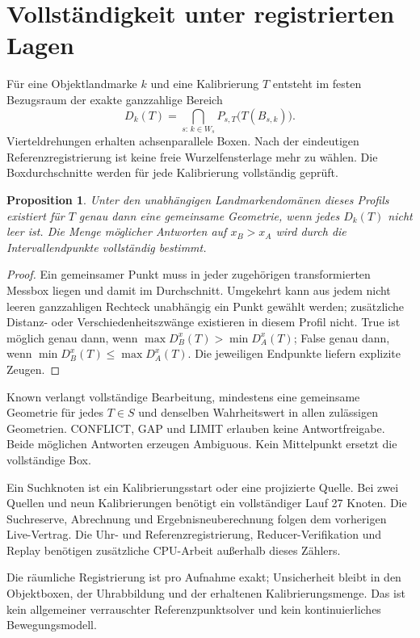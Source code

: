 \documentclass[11pt,a4paper]{article}
\newcommand{\nextsection}[2]{\clearpage{\color{accent}\small\textsf{#1}}\section{#2}}
\newtheorem{proposition}{Proposition}[section]
\begin{document}
\nextsection{79 / GEMEINSAME GEOMETRIE}{Vollständigkeit unter registrierten Lagen}
Für eine Objektlandmarke $k$ und eine Kalibrierung $T$ entsteht
im festen Bezugsraum der exakte ganzzahlige Bereich
\[
D_k(T)=\bigcap_{s:\,k\in W_s}P_{s,T}\bigl(T(B_{s,k})\bigr).
\]
Vierteldrehungen erhalten achsenparallele Boxen. Nach der eindeutigen
Referenzregistrierung ist keine freie Wurzelfensterlage mehr zu wählen.
Die Boxdurchschnitte werden für jede Kalibrierung vollständig geprüft.

\begin{proposition}
Unter den unabhängigen Landmarkendomänen dieses Profils existiert
für $T$ genau dann eine gemeinsame Geometrie, wenn jedes $D_k(T)$
nicht leer ist. Die Menge möglicher Antworten auf $x_B>x_A$ wird
durch die Intervallendpunkte vollständig bestimmt.
\end{proposition}
\begin{proof}
Ein gemeinsamer Punkt muss in jeder zugehörigen transformierten
Messbox liegen und damit im Durchschnitt. Umgekehrt kann aus jedem
nicht leeren ganzzahligen Rechteck unabhängig ein Punkt gewählt
werden; zusätzliche Distanz- oder Verschiedenheitszwänge existieren
in diesem Profil nicht. True ist möglich genau dann, wenn
$\max D_B^x(T)>\min D_A^x(T)$; False genau dann, wenn
$\min D_B^x(T)\leq\max D_A^x(T)$. Die jeweiligen Endpunkte liefern
explizite Zeugen.
\end{proof}

Known verlangt vollständige Bearbeitung, mindestens eine gemeinsame
Geometrie für jedes $T\in S$ und denselben Wahrheitswert in allen
zulässigen Geometrien. CONFLICT, GAP und LIMIT erlauben keine
Antwortfreigabe. Beide möglichen Antworten erzeugen Ambiguous.
Kein Mittelpunkt ersetzt die vollständige Box.

Ein Suchknoten ist ein Kalibrierungsstart oder eine projizierte
Quelle. Bei zwei Quellen und neun Kalibrierungen benötigt ein
vollständiger Lauf 27 Knoten. Die Suchreserve, Abrechnung und
Ergebnisneuberechnung folgen dem vorherigen Live-Vertrag.
Die Uhr- und Referenzregistrierung, Reducer-Verifikation und
Replay benötigen zusätzliche CPU-Arbeit außerhalb dieses Zählers.

Die räumliche Registrierung ist pro Aufnahme exakt; Unsicherheit
bleibt in den Objektboxen, der Uhrabbildung und der erhaltenen
Kalibrierungsmenge. Das ist kein allgemeiner verrauschter
Referenzpunktsolver und kein kontinuierliches Bewegungsmodell.
\end{document}

